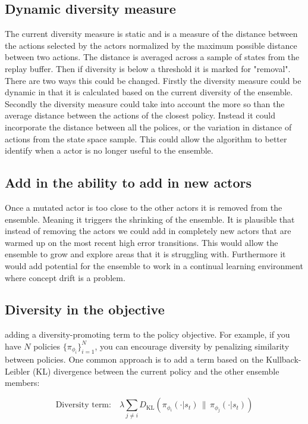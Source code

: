 \subsection{Dynamic diversity measure}
The current diversity measure is static and is a measure of the distance between the actions selected by the actors normalized by the maximum possible distance between two actions. The distance is averaged across a sample of states from the replay buffer. Then if diversity is below a threshold it is marked for "removal". There are two ways this could be changed. Firstly the diversity measure could be dynamic in that it is calculated based on the current diversity of the ensemble. Secondly the diversity measure could take into account the more so than the average distance between the actions of the closest policy. Instead it could incorporate the distance between all the polices, or the variation in distance of actions from the state space sample. This could allow the algorithm to better identify when a actor is no longer useful to the ensemble.

\subsection{Add in the ability to add in new actors}
Once a mutated actor is too close to the other actors it is removed from the ensemble. Meaning it triggers the shrinking of the ensemble. It is plausible that instead of removing the actors we could add in completely new actors that are warmed up on the most recent high error transitions. This would allow the ensemble to grow and explore areas that it is struggling with. Furthermore it would add potential for the ensemble to work in a continual learning environment where concept drift is a problem.

\subsection{Diversity in the objective}
adding a diversity-promoting term to the policy objective. For example, if you have $N$ policies $\{\pi_{\phi_i}\}_{i=1}^N$, you can encourage diversity by penalizing similarity between policies. One common approach is to add a term based on the Kullback-Leibler (KL) divergence between the current policy and the other ensemble members:

\[
\text{Diversity term:} \quad \lambda \sum_{j \neq i} D_{\mathrm{KL}}\left(\pi_{\phi_i}(\cdot|s_t) \,\|\, \pi_{\phi_j}(\cdot|s_t)\right)
\]

